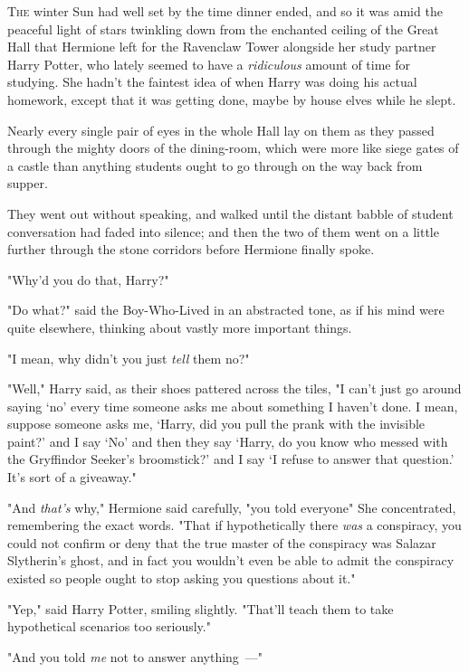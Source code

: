 
\lettrine{T}{he} winter Sun
had well set by the time dinner ended, and so it was amid the peaceful light of
stars twinkling down from the enchanted ceiling of the Great Hall that Hermione
left for the Ravenclaw Tower alongside her study partner Harry Potter, who
lately seemed to have a \emph{ridiculous} amount of time for studying. She
hadn't the faintest idea of when Harry was doing his actual homework, except
that it was getting done, maybe by house elves while he slept.

Nearly every single pair of eyes in the whole Hall lay on them as they passed
through the mighty doors of the dining-room, which were more like siege gates
of a castle than anything students ought to go through on the way back from
supper.

They went out without speaking, and walked until the distant babble of student
conversation had faded into silence; and then the two of them went on a little
further through the stone corridors before Hermione finally spoke.

"Why'd you do that, Harry?"

"Do what?" said the Boy-Who-Lived in an abstracted tone, as if his mind were
quite elsewhere, thinking about vastly more important things.

"I mean, why didn't you just \emph{tell} them no?"

"Well," Harry said, as their shoes pattered across the tiles, "I can't just go
around saying `no' every time someone asks me about something I haven't done. I
mean, suppose someone asks me, `Harry, did you pull the prank with the
invisible paint?' and I say `No' and then they say `Harry, do you know who
messed with the Gryffindor Seeker's broomstick?' and I say `I refuse to answer
that question.' It's sort of a giveaway."

"And \emph{that's} why," Hermione said carefully, "you told everyone{\el}"
She concentrated, remembering the exact words. "That if hypothetically there
\emph{was} a conspiracy, you could not confirm or deny that the true master of
the conspiracy was Salazar Slytherin's ghost, and in fact you wouldn't even be
able to admit the conspiracy existed so people ought to stop asking you
questions about it."

"Yep," said Harry Potter, smiling slightly. "That'll teach them to take
hypothetical scenarios too seriously."

"And you told \emph{me} not to answer anything~---"

